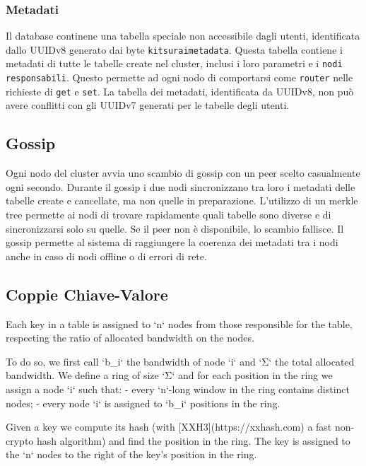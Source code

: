 \subsubsection{Metadati}
\label{subsubsec:metadati}

Il database continene una tabella speciale non accessibile dagli utenti, identificata dallo UUIDv8 generato dai byte \texttt{kitsuraimetadata}.
Questa tabella contiene i metadati di tutte le tabelle create nel cluster, inclusi i loro parametri e i \texttt{nodi responsabili}.
Questo permette ad ogni nodo di comportarsi come \texttt{router} nelle richieste di \texttt{get} e \texttt{set}.
La tabella dei metadati, identificata da UUIDv8, non può avere conflitti con gli UUIDv7 generati per le tabelle degli utenti.

\subsection{Gossip}
\label{subsec:gossip}

Ogni nodo del cluster avvia uno scambio di gossip con un peer scelto casualmente ogni secondo.
Durante il gossip i due nodi sincronizzano tra loro i metadati delle tabelle create e cancellate, ma non quelle in preparazione.
L'utilizzo di un merkle tree permette ai nodi di trovare rapidamente quali tabelle sono diverse e di sincronizzarsi solo su quelle.
Se il peer non è disponibile, lo scambio fallisce.
Il gossip permette al sistema di raggiungere la coerenza dei metadati tra i nodi anche in caso di nodi offline o di errori di rete.

\subsection{Coppie Chiave-Valore}
\label{subsec:coppie-chiave-valore}

Each key in a table is assigned to `n` nodes from those responsible for the table,
respecting the ratio of allocated bandwidth on the nodes.

To do so, we first call `b_i` the bandwidth of node `i` and `Σ` the total allocated bandwidth.
We define a ring of size `Σ` and for each position in the ring we assign a node `i` such that:
- every `n`-long window in the ring contains distinct nodes;
- every node `i` is assigned to `b_i` positions in the ring.

Given a key we compute its hash (with [XXH3](https://xxhash.com) a fast non-crypto hash algorithm)
 and find the position in the ring.
The key is assigned to the `n` nodes to the right of the key's position in the ring.

